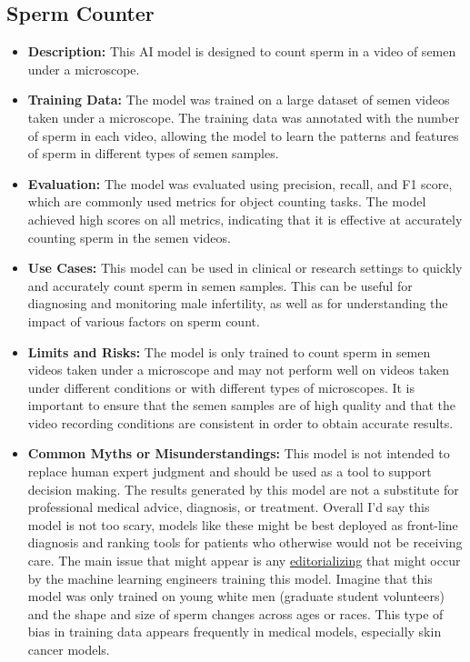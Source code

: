 \subsection{Sperm Counter}

\begin{itemize}
    \item \textbf{Description:} This AI model is designed to count sperm in a video of semen under a microscope.
    \item \textbf{Training Data:} The model was trained on a large dataset of semen videos taken under a microscope. The training data was annotated with the number of sperm in each video, allowing the model to learn the patterns and features of sperm in different types of semen samples.
    \item \textbf{Evaluation:} The model was evaluated using precision, recall, and F1 score, which are commonly used metrics for object counting tasks. The model achieved high scores on all metrics, indicating that it is effective at accurately counting sperm in the semen videos.
    \item \textbf{Use Cases:} This model can be used in clinical or research settings to quickly and accurately count sperm in semen samples. This can be useful for diagnosing and monitoring male infertility, as well as for understanding the impact of various factors on sperm count.
    \item \textbf{Limits and Risks:} The model is only trained to count sperm in semen videos taken under a microscope and may not perform well on videos taken under different conditions or with different types of microscopes. It is important to ensure that the semen samples are of high quality and that the video recording conditions are consistent in order to obtain accurate results.
    \item \textbf{Common Myths or Misunderstandings:} This model is not intended to replace human expert judgment and should be used as a tool to support decision making. The results generated by this model are not a substitute for professional medical advice, diagnosis, or treatment. Overall I'd say this model is not too scary, models like these might be best deployed as front-line diagnosis and ranking tools for patients who otherwise would not be receiving care. The main issue that might appear is any \hyperref[sec:janitor]{editorializing} that might occur by the machine learning engineers training this model. Imagine that this model was only trained on young white men (graduate student volunteers) and the shape and size of sperm changes across ages or races. This type of bias in training data appears frequently in medical models, especially skin cancer models.

\end{itemize}
